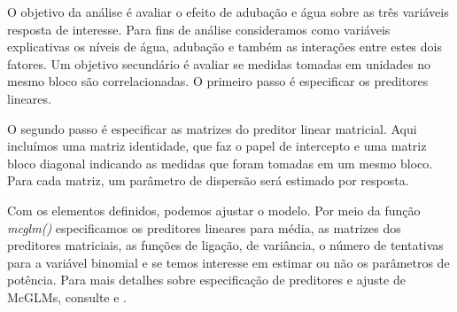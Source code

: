O objetivo da análise é avaliar o efeito de adubação e água sobre as três variáveis resposta de interesse. Para fins de análise consideramos como variáveis explicativas os níveis de água, adubação e também as interações entre estes dois fatores. Um objetivo secundário é avaliar se medidas tomadas em unidades no mesmo bloco são correlacionadas. O primeiro passo é especificar os preditores lineares.

\begin{knitrout}
\color{fgcolor}\begin{kframe}
\begin{alltt}
 \hlkwb{<-}  \hlopt{~}  \hlopt{*} 
 \hlkwb{<-}  \hlopt{~}  \hlopt{*} 

\hlopt{$} \hlkwb{<-} \hlopt{$} \hlopt{/} \hlopt{$}
 \hlkwb{<-}  \hlopt{~}  \hlopt{*} 
\end{alltt}
\end{kframe}
\end{knitrout}

O segundo passo é especificar as matrizes do preditor linear matricial. Aqui incluímos uma matriz identidade, que faz o papel de intercepto e uma matriz bloco diagonal indicando as medidas que foram tomadas em um mesmo bloco. Para cada matriz, um parâmetro de dispersão será estimado por resposta.

\begin{knitrout}
\color{fgcolor}\begin{kframe}
\begin{alltt}
 \hlkwb{<-} 
 \hlkwb{<-} \hlstd{(}\hlopt{~} \hlopt{+}   
\end{alltt}
\end{kframe}
\end{knitrout}

Com os elementos definidos, podemos ajustar o modelo. Por meio da função \emph{mcglm()} especificamos os preditores lineares para média, as matrizes dos preditores matriciais, as funções de ligação, de variância, o número de tentativas para a variável binomial e se temos interesse em estimar ou não os parâmetros de potência. Para mais detalhes sobre especificação de preditores e ajuste de McGLMs, consulte \citet{Bonat16} e \citet{mcglm}.


